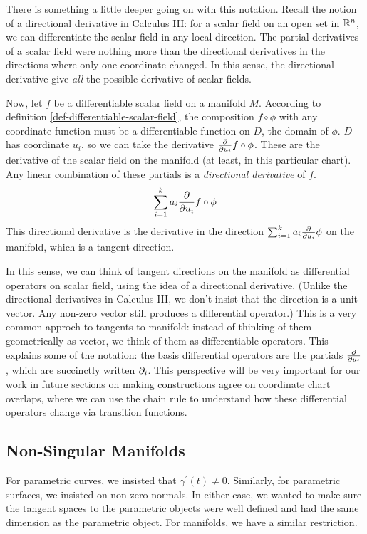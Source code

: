 \documentclass[fleqn,letterpaper]{report}
\begin{document}
There is something a little deeper going on with this
notation. Recall the notion of a directional derivative in
Calculus III: for a scalar field on an open set in $\mathbb{R}^n$, we
can differentiate the scalar field in any local direction.
The partial derivatives of a scalar field were nothing more
than the directional derivatives in the directions where only
one coordinate changed. In this sense, the directional
derivative give \emph{all} the possible derivative of scalar
fields.

Now, let $f$ be a differentiable scalar field on a manifold
$M$. According to definition \ref{def-differentiable-scalar-field}, the
composition $f \circ \phi$ with any coordinate function must
be a differentiable function on $D$, the domain of $\phi$. $D$
has coordinate $u_i$, so we can take the derivative
$\frac{\partial}{\partial u_i} f \circ \phi$. These are the derivative
of the scalar field on the manifold (at least, in this
particular chart). Any linear combination of these partials is
a \emph{directional derivative} of $f$.
\begin{equation*}
\sum_{i=1}^k a_i \frac{\partial}{\partial u_i} f \circ \phi
\end{equation*}
This directional derivative is the derivative in the
direction $\sum_{i=1}^k a_i \frac{\partial}{\partial u_i} \phi$ on the
manifold, which is a tangent direction. 

In this sense, we can think of tangent directions on the
manifold as differential operators on scalar field, using the
idea of a directional derivative.  (Unlike the directional
derivatives in Calculus III, we don't insist that the
direction is a unit vector. Any non-zero vector still produces
a differential operator.) This is a very common approch to
tangents to manifold: instead of thinking of them
geometrically as vector, we think of them as differentiable
operators. This explains some of the notation: the basis
differential operators are the partials $\frac{\partial}{\partial
u_i}$, which are succinctly written $\partial_i$. This perspective
will be very important for our work in future sections on
making constructions agree on coordinate chart overlaps, where
we can use the chain rule to understand how these differential
operators change via transition functions.

\subsection{Non-Singular Manifolds}
\label{non-singular-manifolds}

For parametric curves, we insisted that $\gamma^\prime(t) \neq
0$. Similarly, for parametric surfaces, we insisted on
non-zero normals. In either case, we wanted to make sure the
tangent spaces to the parametric objects were well defined and
had the same dimension as the parametric object.  For
manifolds, we have a similar restriction. 
\end{document}
